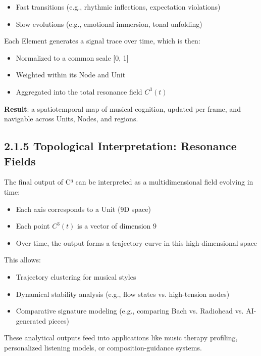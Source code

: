 \documentclass[10pt]{article}
\begin{document}
\begin{itemize}
    \item Fast transitions (e.g., rhythmic inflections, expectation violations)
    \item Slow evolutions (e.g., emotional immersion, tonal unfolding)
\end{itemize}

Each Element generates a signal trace over time, which is then:

\begin{itemize}
    \item Normalized to a common scale [0, 1]
    \item Weighted within its Node and Unit
    \item Aggregated into the total resonance field $C^3(t)$
\end{itemize}

\textbf{Result}: a spatiotemporal map of musical cognition, updated per frame, and navigable across Units, Nodes, and regions.

\subsection*{2.1.5 Topological Interpretation: Resonance Fields}

The final output of C³ can be interpreted as a multidimensional field evolving in time:

\begin{itemize}
    \item Each axis corresponds to a Unit (9D space)
    \item Each point $C^3(t)$ is a vector of dimension 9
    \item Over time, the output forms a trajectory curve in this high-dimensional space
\end{itemize}

This allows:

\begin{itemize}
    \item Trajectory clustering for musical styles
    \item Dynamical stability analysis (e.g., flow states vs. high-tension nodes)
    \item Comparative signature modeling (e.g., comparing Bach vs. Radiohead vs. AI-generated pieces)
\end{itemize}

These analytical outputs feed into applications like music therapy profiling, personalized listening models, or composition-guidance systems.
\end{document}

